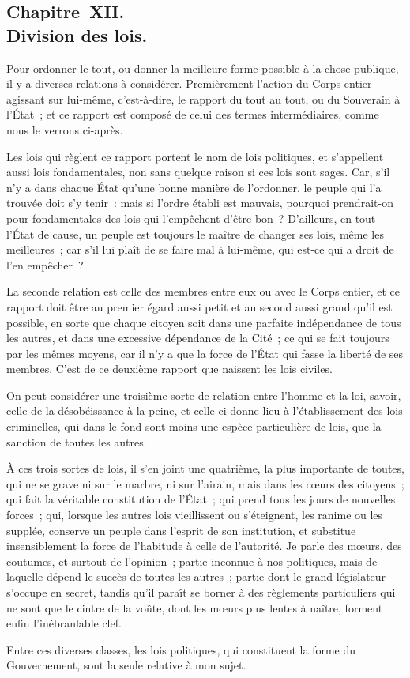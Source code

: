\documentclass[french,twoside]{book} %
\begin{document}
\subsection[{Chapitre XII. Division des lois.}]{Chapitre XII. \\
Division des lois.}
\noindent Pour ordonner le tout, ou donner la meilleure forme possible à la chose publique, il y a diverses relations à considérer. Premièrement l’action du Corps entier agissant sur lui-même, c’est-à-dire, le rapport du tout au tout, ou du Souverain à l’État ; et ce rapport est composé de celui des termes intermédiaires, comme nous le verrons ci-après.\par
Les lois qui règlent ce rapport portent le nom de lois politiques, et s’appellent aussi lois fondamentales, non sans quelque raison si ces lois sont sages. Car, s’il n’y a dans chaque État qu’une bonne manière de l’ordonner, le peuple qui l’a trouvée doit s’y tenir : mais si l’ordre établi est mauvais, pourquoi prendrait-on pour fondamentales des lois qui l’empêchent d’être bon ? D’ailleurs, en tout l’État de cause, un peuple est toujours le maître de changer ses lois, même les meilleures ; car s’il lui plaît de se faire mal à lui-même, qui est-ce qui a droit de l’en empêcher ?\par
La seconde relation est celle des membres entre eux ou avec le Corps entier, et ce rapport doit être au premier égard aussi petit et au second aussi grand qu’il est possible, en sorte que chaque citoyen soit dans une parfaite indépendance de tous les autres, et dans une excessive dépendance de la Cité ; ce qui se fait toujours par les mêmes moyens, car il n’y a que la force de l’État qui fasse la liberté de ses membres. C’est de ce deuxième rapport que naissent les lois civiles.\par
On peut considérer une troisième sorte de relation entre l’homme et la loi, savoir, celle de la désobéissance à la peine, et celle-ci donne lieu à l’établissement des lois criminelles, qui dans le fond sont moins une espèce particulière de lois, que la sanction de toutes les autres.\par
À ces trois sortes de lois, il s’en joint une quatrième, la plus importante de toutes, qui ne se grave ni sur le marbre, ni sur l’airain, mais dans les cœurs des citoyens ; qui fait la véritable constitution de l’État ; qui prend tous les jours de nouvelles forces ; qui, lorsque les autres lois vieillissent ou s’éteignent, les ranime ou les supplée, conserve un peuple dans l’esprit de son institution, et substitue insensiblement la force de l’habitude à celle de l’autorité. Je parle des mœurs, des coutumes, et surtout de l’opinion ; partie inconnue à nos politiques, mais de laquelle dépend le succès de toutes les autres ; partie dont le grand législateur s’occupe en secret, tandis qu’il paraît se borner à des règlements particuliers qui ne sont que le cintre de la voûte, dont les mœurs plus lentes à naître, forment enfin l’inébranlable clef.\par
Entre ces diverses classes, les lois politiques, qui constituent la forme du Gouvernement, sont la seule relative à mon sujet.
\end{document}
